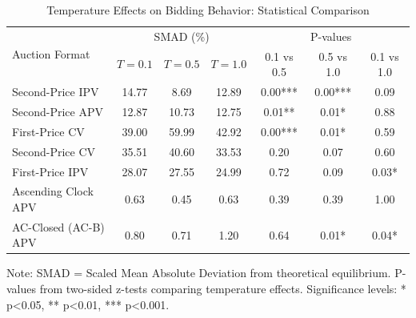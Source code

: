 \begin{table}[htbp]
\centering
\caption{Temperature Effects on Bidding Behavior: Statistical Comparison}
\label{tab:temperature_comparison}
\begin{tabular}{l|ccc|ccc}
\hline
\multirow{2}{*}{Auction Format} & \multicolumn{3}{c|}{SMAD (\%)} & \multicolumn{3}{c}{P-values} \\
 & $T=0.1$ & $T=0.5$ & $T=1.0$ & 0.1 vs 0.5 & 0.5 vs 1.0 & 0.1 vs 1.0 \\
\hline
Second-Price IPV & 14.77 & 8.69 & 12.89 & 0.00*** & 0.00*** & 0.09 \\
Second-Price APV & 12.87 & 10.73 & 12.75 & 0.01** & 0.01* & 0.88 \\
First-Price CV & 39.00 & 59.99 & 42.92 & 0.00*** & 0.01* & 0.59 \\
Second-Price CV & 35.51 & 40.60 & 33.53 & 0.20 & 0.07 & 0.60 \\
First-Price IPV & 28.07 & 27.55 & 24.99 & 0.72 & 0.09 & 0.03* \\
Ascending Clock APV & 0.63 & 0.45 & 0.63 & 0.39 & 0.39 & 1.00 \\
AC-Closed (AC-B) APV & 0.80 & 0.71 & 1.20 & 0.64 & 0.01* & 0.04* \\
\hline
\end{tabular}
\begin{tablenotes}
\small
\item Note: SMAD = Scaled Mean Absolute Deviation from theoretical equilibrium. 
P-values from two-sided z-tests comparing temperature effects. 
Significance levels: * p<0.05, ** p<0.01, *** p<0.001.
\end{tablenotes}
\end{table}